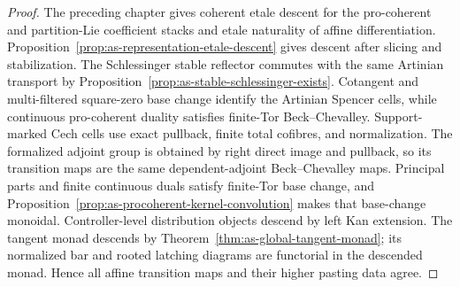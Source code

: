 \begin{proof}
The preceding chapter gives coherent etale descent for the pro-coherent and
partition-Lie coefficient stacks and etale naturality of affine
differentiation.  Proposition~\ref{prop:as-representation-etale-descent}
gives descent after slicing and stabilization.  The Schlessinger stable
reflector commutes with the same Artinian transport by
Proposition~\ref{prop:as-stable-schlessinger-exists}.  Cotangent and
multi-filtered square-zero base change identify the Artinian Spencer cells,
while continuous pro-coherent duality satisfies finite-Tor
Beck--Chevalley.  Support-marked Cech cells use exact pullback, finite total
cofibres, and normalization.  The formalized adjoint group is obtained by
right direct image and pullback, so its transition maps are the same
dependent-adjoint Beck--Chevalley maps.  Principal parts and finite
continuous duals satisfy finite-Tor base change, and
Proposition~\ref{prop:as-procoherent-kernel-convolution} makes that
base-change monoidal.  Controller-level distribution objects descend by left
Kan extension.  The tangent monad descends by
Theorem~\ref{thm:as-global-tangent-monad}; its normalized bar and rooted
latching diagrams are functorial in the descended monad.  Hence all affine
transition maps and their higher pasting data agree.
\end{proof}

